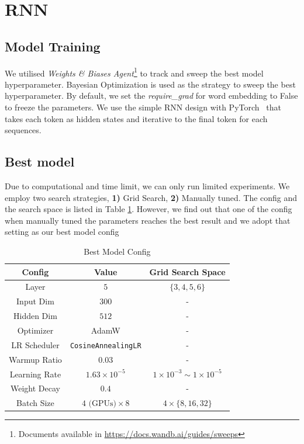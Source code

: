 \section{RNN}
\label{sec:part-rnn}

\subsection{Model Training}

We utilised \textit{Weights \& Biases Agent}\footnote{Documents available in \url{https://docs.wandb.ai/guides/sweeps}} to track and sweep the best model hyperparameter. Bayesian Optimization \cite{dewancker2016bayesian} is used as the strategy to sweep the best hyperparameter. By default, we set the \textit{require\_grad} for word embedding to False to freeze the parameters. We use the simple RNN design with PyTorch~\citep{paszke2019pytorch} that takes each token as hidden states and iterative to the final token for each sequences.

\subsection{Best model}

Due to computational and time limit, we can only run limited experiments. We employ two search strategies, \textbf{1)} Grid Search, \textbf{2)} Manually tuned. The config and the search space is listed in Table \ref{tab:best_model_config}. However, we find out that one of the config when manually tuned the parameters reaches the best result and we adopt that setting as our best model config

\begin{table}[ht]
    \centering
    \begin{tabular}{c | c | c}
    \toprule
    \textbf{Config} & \textbf{Value} & \textbf{Grid Search Space}\\
    \midrule
    Layer & $5$ & $\{3,4,5,6\}$\\
    Input Dim & $300$ & -\\
    Hidden Dim & $512$ & - \\
    \midrule
    Optimizer & AdamW & - \\
    LR Scheduler & \texttt{CosineAnnealingLR} & - \\
    Warmup Ratio & 0.03 & - \\
    Learning Rate & $1.63\times 10^{-5}$ & $1 \times 10^{-3} \sim 1 \times 10^{-5}$\\
    Weight Decay & $0.4$ & - \\
    Batch Size & $4 \text{ (GPUs)}\times 8$ & $4\times \{8, 16, 32\}$\\
    \bottomrule
    \end{tabular}
    \caption{Best Model Config}
    \label{tab:best_model_config}
\end{table}

